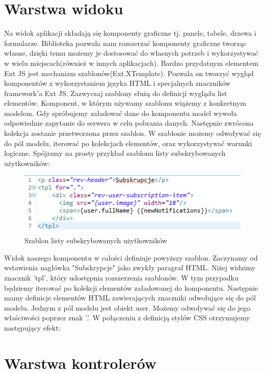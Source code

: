 \section{Warstwa widoku}

Na widok aplikacji składają się komponenty graficzne tj. panele, tabele, drzewa i formularze. Biblioteka pozwala nam rozszerzać komponenty graficzne tworząc własne, dzięki temu możemy je dostosować do własnych potrzeb i wykorzystywać w wielu miejscach(również w innych aplikacjach). Bardzo przydatnym elementem Ext JS jest mechanizm szablonów(Ext.XTemplate). Pozwala on tworzyć wygląd komponentów z wykorzystaniem języka HTML i specjalnych znaczników framework'a Ext JS. Zazwyczaj szablony służą do definicji wyglądu list elementów. Komponent, w którym używamy szablonu wiążemy z konkretnym modelem. Gdy spróbujemy załadować dane do komponentu model wywoła odpowiednie zapytanie do serwera w celu pobrania danych. Następnie zwrócona kolekcja zostanie przetworzona przez szablon. W szablonie możemy odwoływać się do pól modelu, iterować po kolekcjach elementów, oraz wykorzystywać warunki logiczne. Spójrzmy na prosty przykład szablonu listy subskrybowanych użytkowników:
 
\begin{figure}[H]
	\centering
	\includegraphics[width=\textwidth]{images/tpl.png}
	\caption{Szablon listy subskrybowanych użytkowników}
\end{figure}

Widok naszego komponentu w całości definiuje powyższy szablon. Zaczynamy od wstawienia nagłówka "Subskrypcje" jako zwykły paragraf HTML. Niżej widzimy znacznik 'tpl', który udostępnia rozszerzenia szablonów. W tym przypadku będziemy iterować po kolekcji elementów załadowanej do komponentu. Następnie mamy definicje elementów HTML zawierających znaczniki odwołujące się do pól modelu. Jednym z pól modelu jest obiekt user. Możemy odwoływać się do jego właściwości poprzez znak '.'. W połączeniu z definicją stylów CSS otrzymujemy następujący efekt:

 


\section{Warstwa kontrolerów}

